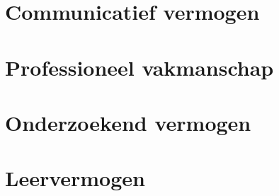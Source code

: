 \chapter{Communicatief vermogen}
\label{sec:Communicative ability}


\chapter{Professioneel vakmanschap}
\label{sec:professional_competence}


\chapter{Onderzoekend vermogen}
\label{sec:research_skill}


\chapter{Leervermogen}
\label{sec:Learning}

